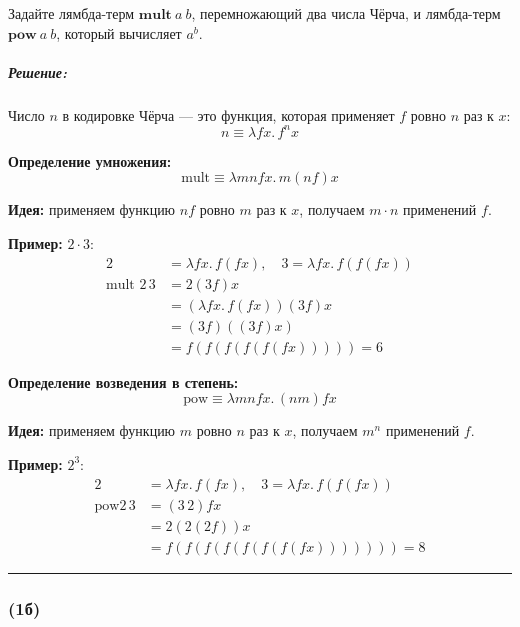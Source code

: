 \documentclass{article}
\newenvironment{proof}{\subparagraph{\hspace{-1em}Решение:\newline}}{\par\noindent\rule{\textwidth}{0.4pt}}
\newcommand{\term}[1]{\mathbf{#1}}
\begin{document}
    Задайте лямбда-терм $\term{mult}~a~b$, перемножающий два числа Чёрча, и лямбда-терм $\term{pow}~a~b$, который вычисляет $a^b$.

    \begin{proof}

        Число $n$ в кодировке Чёрча --- это функция, которая применяет $f$ ровно $n$ раз к $x$:
        \[
            n \equiv \lambda f x.\, f^n x
        \]

        \textbf{Определение умножения:}
        \[
            \text{mult} \equiv \lambda m n f x.\, m (n f) x
        \]

        \textbf{Идея:} применяем функцию $n f$ ровно $m$ раз к $x$, получаем $m \cdot n$ применений $f$.

        \textbf{Пример:} $2 \cdot 3$:
        \[
            \begin{aligned}
                2 &= \lambda f x.\, f(f x), \quad 3 = \lambda f x.\, f(f(f x)) \\
                \text{mult } 2\, 3 &= 2 (3 f) x \\
                &= (\lambda f x.\, f(f x)) (3 f) x \\
                &= (3 f)((3 f) x) \\
                &= f(f(f(f(f(f x))))) = 6
            \end{aligned}
        \]

        \textbf{Определение возведения в степень:}
        \[
            \text{pow} \equiv \lambda m n f x.\, (n m) f x
        \]

        \textbf{Идея:} применяем функцию $m$ ровно $n$ раз к $x$, получаем $m^n$ применений $f$.

        \textbf{Пример:} $2^3$:
        \[
            \begin{aligned}
                2 &= \lambda f x.\, f(f x), \quad 3 = \lambda f x.\, f(f(f x)) \\
                \text{pow} 2\, 3 &= (3\, 2) f x \\
                &= 2 (2 (2 f)) x \\
                &= f(f(f(f(f(f(f(f x))))))) = 8
            \end{aligned}
        \]


    \end{proof}

    \subsubsection{(1б)}
\end{document}
